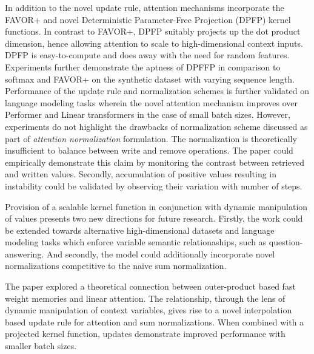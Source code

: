 \documentclass[11pt,letterpaper]{article}
\begin{document}
In addition to the novel update rule, attention mechanisms incorporate the FAVOR+ and novel Deterministic Parameter-Free Projection (DPFP) kernel functions. In contrast to FAVOR+, DPFP suitably projects up the dot product dimension, hence allowing attention to scale to high-dimensional context inputs. DPFP is easy-to-compute and does away with the need for random features. Experiments further demonstrate the aptness of DPFFP in comparison to softmax and FAVOR+ on the synthetic dataset with varying sequence length. Performance of the update rule and normalization schemes is further validated on language modeling tasks wherein the novel attention mechanism improves over Performer and Linear transformers in the case of small batch sizes. However, experiments do not highlight the drawbacks of normalization scheme discussed as part of \textit{attention normalization} formulation. The normalization is theoretically insufficient to balance between write and remove operations. The paper could empirically demonstrate this claim by monitoring the contrast between retrieved and written values. Secondly, accumulation of positive values resulting in instability could be validated by observing their variation with number of steps. 

Provision of a scalable kernel function in conjunction with dynamic manipulation of values presents two new directions for future research. Firstly, the work could be extended towards alternative high-dimensional datasets and language modeling tasks which enforce variable semantic relationaships, such as question-answering. And secondly, the model could additionally incorporate novel normalizations competitive to the naive sum normalization. 

The paper explored a theoretical connection between outer-product based fast weight memories and linear attention. The relationship, through the lens of dynamic manipulation of context variables, gives rise to a novel interpolation based update rule for attention and sum normalizations. When combined with a projected kernel function, updates demonstrate improved performance with smaller batch sizes. 
\end{document}
